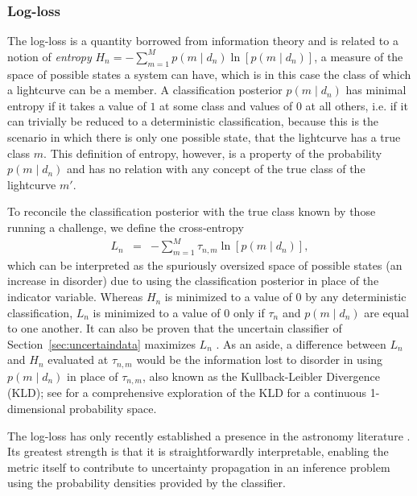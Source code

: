 \subsubsection{Log-loss}
\label{sec:logloss}

The log-loss is a quantity borrowed from information theory and is related to a notion of \textit{entropy} $H_{n} = - \sum_{m=1}^{M} p(m \mid d_{n}) \ln[p(m \mid d_{n})]$, a measure of the space of possible states a system can have, which is in this case the class of which a lightcurve can be a member.
A classification posterior $p(m \mid d_{n})$ has minimal entropy if it takes a value of $1$ at some class and values of $0$ at all others, i.e. if it can trivially be reduced to a deterministic classification, because this is the scenario in which there is only one possible state, that the lightcurve has a true class $m$.
This definition of entropy, however, is a property of the probability $p(m \mid d_{n})$ and has no relation with any concept of the true class of the lightcurve $m'$.

To reconcile the classification posterior with the true class known by those running a challenge, we define the cross-entropy
\begin{eqnarray}
  \label{eq:logloss}
  L_{n} &=& -\sum_{m=1}^{M} \tau_{n, m} \ln[p(m \mid d_{n})],
\end{eqnarray}
which can be interpreted as the spuriously oversized space of possible states (an increase in disorder) due to using the classification posterior in place of the indicator variable.
Whereas $H_{n}$ is minimized to a value of $0$ by any deterministic classification, $L_{n}$ is minimized to a value of $0$ only if $\tau_{n}$ and $p(m \mid d_{n})$ are equal to one another.
It can also be proven that the uncertain classifier of Section~\ref{sec:uncertaindata} maximizes $L_{n}$ \citep{murphy_machine_2012}.
As an aside, a difference between $L_{n}$ and $H_{n}$ evaluated at $\tau_{n, m}$ would be the information lost to disorder in using $p(m \mid d_{n})$ in place of $\tau_{n, m}$, also known as the Kullback-Leibler Divergence (KLD); see \citet{malz_approximating_2018} for a comprehensive exploration of the KLD for a continuous 1-dimensional probability space.

The log-loss has only recently established a presence in the astronomy literature \citep{hon_deep_2017, hon_deep_2018}.
Its greatest strength is that it is straightforwardly interpretable, enabling the metric itself to contribute to uncertainty propagation in an inference problem using the probability densities provided by the classifier.

